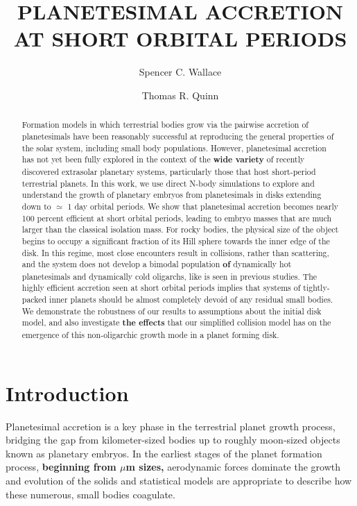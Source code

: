 \documentclass[twocolumn,linenumbers]{aastex63}
\begin{document}
\title{PLANETESIMAL ACCRETION AT SHORT ORBITAL PERIODS}

\author{Spencer C. Wallace}

\author{Thomas R. Quinn}

\begin{abstract}
Formation models in which terrestrial bodies grow via the pairwise
accretion of planetesimals have been reasonably successful at
reproducing the general properties of the solar system, including
small body populations. However, planetesimal accretion has not yet
been fully explored in the context of the \textbf{wide variety} of recently discovered extrasolar planetary systems,
particularly those that host short-period terrestrial planets. In this work, we
use direct N-body simulations to explore and understand the growth of
planetary embryos from planetesimals in disks extending down to
$\simeq$ 1 day orbital periods. We show that planetesimal accretion
becomes nearly 100 percent efficient at short orbital periods, leading
to embryo masses that are much larger than the classical
isolation mass. For rocky bodies, the physical size of the object
begins to occupy a significant fraction of its Hill sphere towards the inner edge of the disk. In this regime, most close encounters
result in collisions, rather than scattering, and the system does not
develop a bimodal population \textbf{of} dynamically hot planetesimals and
dynamically cold oligarchs, like is seen in previous studies. The highly
efficient accretion seen at short orbital periods implies that systems
of tightly-packed inner planets should be almost completely devoid of
any residual small bodies. We demonstrate the robustness of our
results to assumptions about the initial disk model, and also
investigate \textbf{the effects} that our simplified collision model has on the emergence
of this non-oligarchic growth mode in a planet forming disk.
\end{abstract}

\section{Introduction} \label{sec:intro}

Planetesimal accretion is a key phase in the terrestrial planet growth
process, bridging the gap from kilometer-sized bodies up to roughly
moon-sized objects known as planetary embryos. In the earliest stages
of the planet formation process, \textbf{beginning from $\mu$m sizes,} aerodynamic forces dominate the
growth and evolution of the solids and statistical models
\citep{johansen14, birnstiel16} are appropriate to describe how these
numerous, small bodies coagulate. 
\end{document}
